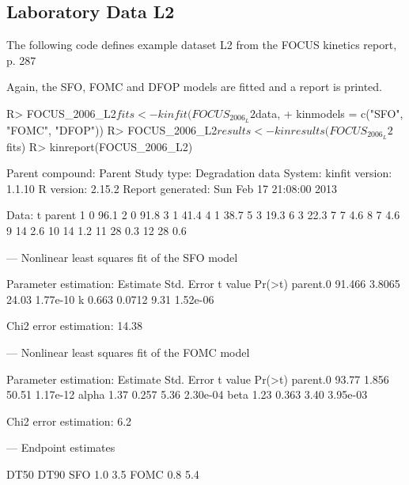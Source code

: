 \documentclass[12pt,a4paper]{article}
\begin{document}
\subsection{Laboratory Data L2}

The following code defines example dataset L2 from the FOCUS kinetics
report, p. 287

\begin{Schunk}
\end{Schunk}

Again, the SFO, FOMC and DFOP models are fitted and a report is printed.

\begin{Schunk}
\begin{Sinput}
R> FOCUS_2006_L2$fits <- kinfit(FOCUS_2006_L2$data, 
+   kinmodels = c("SFO", "FOMC", "DFOP"))
R> FOCUS_2006_L2$results <- kinresults(FOCUS_2006_L2$fits)
R> kinreport(FOCUS_2006_L2)
\end{Sinput}
\begin{Soutput}
Parent compound:  Parent 
Study type:       Degradation data 
System:            
kinfit version:   1.1.10 
R version:        2.15.2 
Report generated: Sun Feb 17 21:08:00 2013 

Data:
    t parent
1   0   96.1
2   0   91.8
3   1   41.4
4   1   38.7
5   3   19.3
6   3   22.3
7   7    4.6
8   7    4.6
9  14    2.6
10 14    1.2
11 28    0.3
12 28    0.6



---
Nonlinear least squares fit of the SFO model

Parameter estimation:	
         Estimate Std. Error t value   Pr(>t)
parent.0   91.466     3.8065   24.03 1.77e-10
k           0.663     0.0712    9.31 1.52e-06

Chi2 error estimation: 14.38 %



---
Nonlinear least squares fit of the FOMC model

Parameter estimation:	
         Estimate Std. Error t value   Pr(>t)
parent.0    93.77      1.856   50.51 1.17e-12
alpha        1.37      0.257    5.36 2.30e-04
beta         1.23      0.363    3.40 3.95e-03

Chi2 error estimation: 6.2 %



---
Endpoint estimates

     DT50 DT90
SFO   1.0  3.5
FOMC  0.8  5.4
\end{Soutput}
\end{Schunk}
\end{document}
